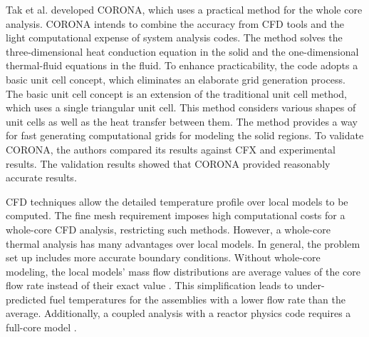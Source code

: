 Tak et al. \cite{tak_practical_2012} \cite{tak_development_2014} developed CORONA, which uses a practical method for the whole core analysis.
CORONA intends to combine the accuracy from CFD tools and the light computational expense of system analysis codes.
The method solves the three-dimensional heat conduction equation in the solid and the one-dimensional thermal-fluid equations in the fluid.
To enhance practicability, the code adopts a basic unit cell concept, which eliminates an elaborate grid generation process.
The basic unit cell concept is an extension of the traditional unit cell method, which uses a single triangular unit cell.
This method considers various shapes of unit cells as well as the heat transfer between them.
The method provides a way for fast generating computational grids for modeling the solid regions.
To validate CORONA, the authors compared its results against CFX and experimental results.
The validation results showed that CORONA provided reasonably accurate results.

CFD techniques allow the detailed temperature profile over local models to be computed.
The fine mesh requirement imposes high computational costs for a whole-core CFD analysis, restricting such methods.
However, a whole-core thermal analysis has many advantages over local models.
In general, the problem set up includes more accurate boundary conditions.
Without whole-core modeling, the local models' mass flow distributions are average values of the core flow rate instead of their exact value \cite{huning_novel_2016}.
This simplification leads to under-predicted fuel temperatures for the assemblies with a lower flow rate than the average.
Additionally, a coupled analysis with a reactor physics code requires a full-core model \cite{tak_practical_2012}.


